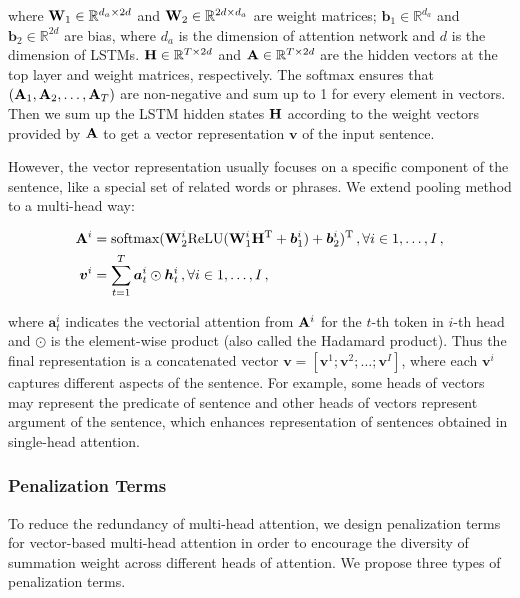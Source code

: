 \documentclass[11pt]{article}
\newcommand{\vect}[1]{\bm{#1}}
\newcommand{\mat}[1]{\bf{#1}}
\newcommand{\RR}{\mathbb{R}}
\begin{document}
\noindent where ${\mat W}_1 \in \RR^{d_a \times 2d}$ and ${\mat W}_2 \in \RR^{2d \times d_a}$ are weight matrices; ${\vect b_1} \in \RR^{d_a}$ and ${\vect b_2} \in \RR^{2d}$ are bias, where $d_a$ is the dimension of attention network and $d$ is the dimension of LSTMs. ${\mat H} \in \RR^{T \times 2d}$ and ${\mat A} \in \RR^{T \times 2d}$ are the hidden vectors at the top layer and weight matrices, respectively. The softmax ensures that $({\mat A}_1, {\mat A}_2, \dots, {\mat A}_T)$ are non-negative and sum up to 1 for every element in vectors. Then we sum up the LSTM hidden states ${\mat H}$ according to the weight vectors provided by ${\mat A}$ to get a vector representation ${\vect v}$ of the input sentence.

However, the vector representation usually focuses on a specific component of the sentence, like a special set of related words or phrases. We extend pooling method to a multi-head way: 

\begin{align}
\label{equ:att}
{\mat A}^i &= \text{softmax}({\mat W}^i_2\text{ReLU}({\mat W}^i_1 {\mat H}^\mathrm{T} + {\vect b^i_1} ) + {\vect b^i_2})^\mathrm{T} \,, \forall i \in {1,\dots, I} \,, \\
{\vect v}^i &= \sum_{t=1}^{T}{\vect a}^i_t \odot {\vect h^i_t}  \,, \forall i \in {1,\dots, I} \,,
\end{align}

\noindent where ${\vect a}^i_t$ indicates the vectorial attention from ${\mat A}^i$ for the $t$-th token in $i$-th head and $\odot$ is the element-wise product (also called the Hadamard product). Thus the final representation is a concatenated vector ${\vect v} = [{\vect v}^1;{\vect v}^2;\dots;{\vect v}^I]$, where each ${\vect v}^i$ captures different aspects of the sentence. For example, some heads of vectors may represent the predicate of sentence and other heads of vectors represent argument of the sentence, which enhances representation of sentences obtained in single-head attention.

\subsubsection{Penalization Terms}

To reduce the redundancy of multi-head attention, we design penalization terms for vector-based multi-head attention in order to encourage the diversity of summation weight across different heads of attention. We propose three types of penalization terms.
\end{document}
